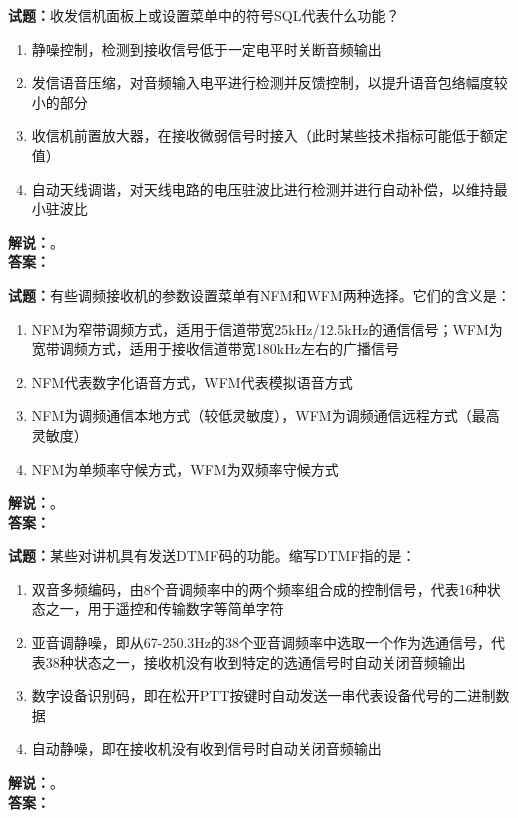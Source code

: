 \documentclass{ctexbook}
\begin{document}
\bigskip




\noindent\textbf{试题：}收发信机面板上或设置菜单中的符号SQL代表什么功能？
\begin{enumerate}[leftmargin=3em]
\item 静噪控制，检测到接收信号低于一定电平时关断音频输出
\item 发信语音压缩，对音频输入电平进行检测并反馈控制，以提升语音包络幅度较小的部分
\item 收信机前置放大器，在接收微弱信号时接入（此时某些技术指标可能低于额定值）
\item 自动天线调谐，对天线电路的电压驻波比进行检测并进行自动补偿，以维持最小驻波比
\end{enumerate}
\noindent\textbf{解说：}\textbf{}。\\\noindent\textbf{答案：}

\bigskip




\noindent\textbf{试题：}有些调频接收机的参数设置菜单有NFM和WFM两种选择。它们的含义是：
\begin{enumerate}[leftmargin=3em]
\item NFM为窄带调频方式，适用于信道带宽25\unit{\kHz}/12.5\unit{\kHz}的通信信号；WFM为宽带调频方式，适用于接收信道带宽180\unit{\kHz}左右的广播信号
\item NFM代表数字化语音方式，WFM代表模拟语音方式
\item NFM为调频通信本地方式（较低灵敏度），WFM为调频通信远程方式（最高灵敏度）
\item NFM为单频率守候方式，WFM为双频率守候方式
\end{enumerate}
\noindent\textbf{解说：}\textbf{}。\\\noindent\textbf{答案：}

\bigskip




\noindent\textbf{试题：}某些对讲机具有发送DTMF码的功能。缩写DTMF指的是：
\begin{enumerate}[leftmargin=3em]
\item 双音多频编码，由8个音调频率中的两个频率组合成的控制信号，代表16种状态之一，用于遥控和传输数字等简单字符
\item 亚音调静噪，即从67-250.3Hz的38个亚音调频率中选取一个作为选通信号，代表38种状态之一，接收机没有收到特定的选通信号时自动关闭音频输出
\item 数字设备识别码，即在松开PTT按键时自动发送一串代表设备代号的二进制数据
\item 自动静噪，即在接收机没有收到信号时自动关闭音频输出
\end{enumerate}
\noindent\textbf{解说：}\textbf{}。\\\noindent\textbf{答案：}
\end{document}

